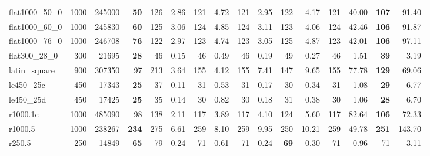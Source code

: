\begin{table*}[tbh]
\begin{adjustbox}{width=0.934\textwidth}
\begin{minipage}[b]{\textwidth}
\begin{tabular}{@{} lrrrrrrrrrrrrrrr @{}}
flat1000\_50\_0 & 1000 & 245000 & \textbf{50} & 126 & 2.86 & 121 & 4.72 & 121 & 2.95 & 122 & 4.17 & 121 & 40.00 & \textbf{107} & 91.40 \\
flat1000\_60\_0 & 1000 & 245830 & \textbf{60} & 125 & 3.06 & 124 & 4.85 & 124 & 3.11 & 123 & 4.06 & 124 & 42.46 & \textbf{106} & 91.87 \\
flat1000\_76\_0 & 1000 & 246708 & \textbf{76} & 122 & 2.97 & 123 & 4.74 & 123 & 3.05 & 125 & 4.87 & 123 & 42.01 & \textbf{106} & 97.11 \\
flat300\_28\_0 & 300 & 21695 & \textbf{28} & 46 & 0.15 & 46 & 0.49 & 46 & 0.19 & 49 & 0.27 & 46 & 1.51 & \textbf{39} & 3.19 \\
latin\_square & 900 & 307350 & 97 & 213 & 3.64 & 155 & 4.12 & 155 & 7.41 & 147 & 9.65 & 155 & 77.78 & \textbf{129} & 69.06 \\
le450\_25c & 450 & 17343 & \textbf{25} & 37 & 0.11 & 31 & 0.53 & 31 & 0.17 & 30 & 0.34 & 31 & 1.08 & \textbf{29} & 6.77 \\
le450\_25d & 450 & 17425 & \textbf{25} & 35 & 0.14 & 30 & 0.82 & 30 & 0.18 & 31 & 0.38 & 30 & 1.06 & \textbf{28} & 6.70 \\
r1000.1c & 1000 & 485090 & 98 & 138 & 2.11 & 117 & 3.89 & 117 & 4.10 & 124 & 5.60 & 117 & 82.64 & \textbf{106} & 72.33 \\
r1000.5 & 1000 & 238267 & \textbf{234} & 275 & 6.61 & 259 & 8.10 & 259 & 9.95 & 250 & 10.21 & 259 & 49.78 & \textbf{251} & 143.70 \\
r250.5 & 250 & 14849 & \textbf{65} & 79 & 0.24 & 71 & 0.61 & 71 & 0.24 & \textbf{69} & 0.30 & 71 & 0.96 & 71 & 3.11 \\
\bottomrule
\end{tabular}
\end{minipage}
\end{adjustbox}
\end{table*}